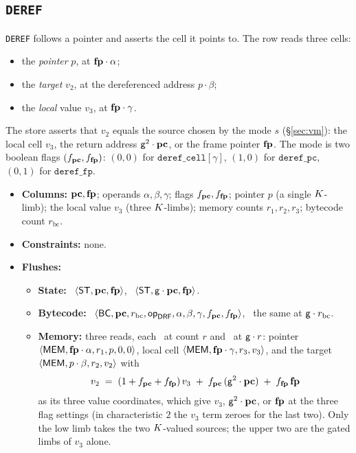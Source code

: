 \subsection{\texttt{DEREF}}\label{sec:tab-deref}

\texttt{DEREF} follows a pointer and asserts the cell it points to. The row reads three cells:
\begin{itemize}
\item the \emph{pointer} $p$, at $\mathbf{fp}\cdot\alpha$;
\item the \emph{target} $v_2$, at the dereferenced address $p\cdot\beta$;
\item the \emph{local} value $v_3$, at $\mathbf{fp}\cdot\gamma$.
\end{itemize}
The store asserts that $v_2$ equals the source chosen by the mode $s$ (\S\ref{sec:vm}): the local cell $v_3$, the return address $\mathsf{g}^{2}\cdot\mathbf{pc}$, or the frame pointer $\mathbf{fp}$. The mode is two boolean flags $(f_{\mathbf{pc}},f_{\mathbf{fp}})$: $(0,0)$ for $\texttt{deref\_cell}[\gamma]$, $(1,0)$ for $\texttt{deref\_pc}$, $(0,1)$ for $\texttt{deref\_fp}$.
\begin{itemize}
\item \textbf{Columns:} $\mathbf{pc},\mathbf{fp}$; operands $\alpha,\beta,\gamma$; flags $f_{\mathbf{pc}},f_{\mathbf{fp}}$; pointer $p$ (a single $K$-limb); the local value $v_3$ (three $K$-limbs); memory counts $r_1,r_2,r_3$; bytecode count $r_{\mathrm{bc}}$.
\item \textbf{Constraints:} none.
\item \textbf{Flushes:}
  \begin{itemize}
  \item \textbf{State:} \pull\ $\langle \mathsf{ST},\mathbf{pc},\mathbf{fp} \rangle$, \push\ $\langle \mathsf{ST},\mathsf{g}\cdot\mathbf{pc},\mathbf{fp} \rangle$.
  \item \textbf{Bytecode:} \pull\ $\langle \mathsf{BC},\mathbf{pc},r_{\mathrm{bc}},\mathsf{op}_{\mathsf{DRF}},\alpha,\beta,\gamma,f_{\mathbf{pc}},f_{\mathbf{fp}} \rangle$, \push\ the same at $\mathsf{g}\cdot r_{\mathrm{bc}}$.
  \item \textbf{Memory:} three reads, each \pull\ at count $r$ and \push\ at $\mathsf{g}\cdot r$: pointer $\langle \mathsf{MEM},\mathbf{fp}\cdot\alpha,r_1,p,0,0 \rangle$, local cell $\langle \mathsf{MEM},\mathbf{fp}\cdot\gamma,r_3,v_3 \rangle$, and the target $\langle \mathsf{MEM},p\cdot\beta,r_2,v_2 \rangle$ with
    \[
      v_2 \;=\; (1+f_{\mathbf{pc}}+f_{\mathbf{fp}})\,v_3 \;+\; f_{\mathbf{pc}}\,(\mathsf{g}^{2}\cdot\mathbf{pc}) \;+\; f_{\mathbf{fp}}\,\mathbf{fp}
    \]
    as its three value coordinates, which give $v_3$, $\mathsf{g}^{2}\cdot\mathbf{pc}$, or $\mathbf{fp}$ at the three flag settings (in characteristic $2$ the $v_3$ term zeroes for the last two). Only the low limb takes the two $K$-valued sources; the upper two are the gated limbs of $v_3$ alone.
  \end{itemize}
\end{itemize}

